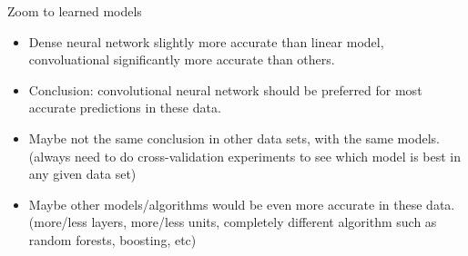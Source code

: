 \documentclass[12pt]{article}
\begin{document}
{Zoom to learned models}
\begin{itemize}
\item Dense neural network slightly more accurate
  than linear model, convoluational significantly more
  accurate than others.
\item Conclusion: convolutional neural network should be preferred
  for most accurate predictions in these data.
\item Maybe not the same conclusion in other data sets, with the
  same models. (always need to do cross-validation experiments to
  see which model is best in any given data set)
\item Maybe other models/algorithms would be even more accurate in
  these data. (more/less layers, more/less units, completely
  different algorithm such as random forests, boosting, etc)
\end{itemize}


 
\end{document}
